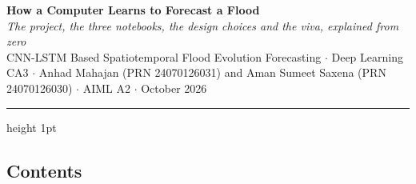 \documentclass[9pt,a4paper]{extarticle}
\let\origsubsection\subsection
\renewcommand{\subsection}{\Needspace{3\baselineskip}\origsubsection}
\begin{document}
\begin{center}
{\fontsize{22}{26}\selectfont\bfseries\color{maroon} How a Computer Learns to Forecast a Flood}\\[3pt]
{\normalsize\itshape The project, the three notebooks, the design choices and the viva, explained from zero}\\[3pt]
{\footnotesize CNN-LSTM Based Spatiotemporal Flood Evolution Forecasting $\cdot$ Deep Learning CA3 $\cdot$ Anhad Mahajan (PRN 24070126031) and Aman Sumeet Saxena (PRN 24070126030) $\cdot$ AIML A2 $\cdot$ October 2026}
\end{center}
{\color{maroon}\hrule height 1pt}
\vspace{3pt}
\subsection*{Contents}
\end{document}
